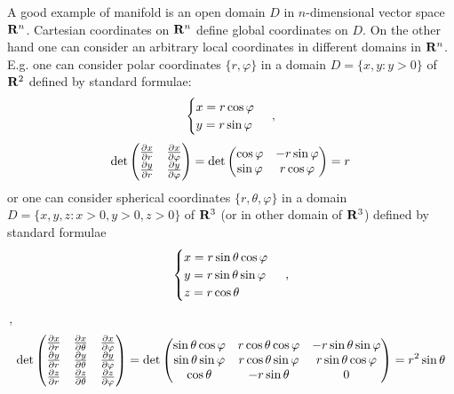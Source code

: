 \documentclass[12pt]{article}
\theoremstyle{theorem}
\numberwithin{equation}{section}
\begin{document}
    A good example of manifold is an open domain  $D$ in  $n$-dimensional vector space ${\bf R}^n$.
    Cartesian coordinates on ${\bf R}^n$ define global coordinates on $D$.
    On the other hand one can consider an arbitrary local coordinates in different domains in ${\bf R}^n$. E.g. one can consider polar coordinates $\{r,\varphi\}$ in a domain $D=\{x,y\colon y>0\}$ of ${\bf R}^2$
    defined by standard formulae:
              \begin{equation}\label{exampleofpolarcoordinates}
                \begin{cases}
                x=r\cos\varphi\cr y=r\sin\varphi\cr
                \end{cases}\,,
              \end{equation}
            \begin{equation}\label{jacobianofpolartransform}
                \det
          \begin{pmatrix}
          {\partial x\over \partial r} &{\partial x\over \partial \varphi}\cr
          {\partial y\over \partial r} &{\partial y\over \partial \varphi}\cr
          \end{pmatrix}=
                \det
          \begin{pmatrix}
          \cos\varphi &-r\sin\varphi\cr
          \sin\varphi &r\cos\varphi\cr
          \end{pmatrix}=r
            \end{equation}
             or one can consider spherical coordinates  $\{r,\theta,\varphi\}$ in a domain
  $D=\{x,y,z\colon x>0,y>0, z>0\}$ of ${\bf R}^3$ (or in other domain of ${\bf R}^3$)
  defined by standard formulae
  \begin{equation*}
                \begin{cases}
                x=r\sin\theta\cos\varphi\cr y=r\sin\theta\sin\varphi\cr z=r\cos\theta
                \end{cases}\,,
              \end{equation*}\,,
              \begin{equation}\label{jacobianofspherictransform}
                \det
          \begin{pmatrix}
          {\partial x\over \partial r} &{\partial x\over \partial \theta} &{\partial x\over \partial \varphi}\cr
          {\partial y\over \partial r} &{\partial y\over \partial \theta} &{\partial y\over \partial \varphi}\cr
           {\partial z\over \partial r} &{\partial z\over \partial \theta} &{\partial z\over \partial \varphi}\cr
          \end{pmatrix}=
                \det
          \begin{pmatrix}
          \sin\theta\cos\varphi &r\cos\theta\cos\varphi &-r\sin\theta\sin\varphi\cr
          \sin\theta\sin\varphi &r\cos\theta\sin\varphi &r\sin\theta\cos\varphi\cr
           \cos\theta &-r\sin\theta &0\cr
                 \end{pmatrix}=r^2\sin\theta
            \end{equation}
\end{document}

